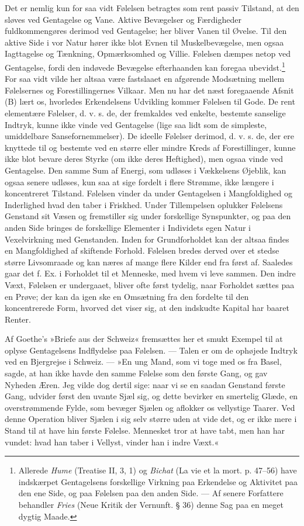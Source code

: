 \documentclass[12pt,a4paper,openany]{book}
\newcommand{\opage}[1]{\marginnote{\footnotesize\textit{[#1]}}}
\begin{document}
Det er nemlig kun for saa vidt Følelsen betragtes som rent passiv
Tilstand, at den sløves ved Gentagelse og Vane. Aktive Bevægelser og
Færdigheder fuldkommengøres derimod ved Gentagelse; her bliver Vanen til
Øvelse. Til den aktive Side i vor Natur hører ikke blot Evnen til
Muskelbevægelse, men ogsaa Iagttagelse og Tænkning, Opmærksomhed og
Villie. Følelsen dæmpes netop ved Gentagelse, fordi den indøvede
Bevægelse efterhaanden kan foregaa ubevidst.\footnote[1]{Allerede
\emph{Hume} (Treatise II, 3, 1) og \emph{Bichat} (La vie et la mort. p.
47--56) have indskærpet Gentagelsens forskellige Virkning paa Erkendelse
og Aktivitet paa den ene Side, og paa Følelsen paa den anden Side. ---
Af senere Forfattere behandler \emph{Fries} (Neue Kritik der Vernunft. §
36) denne Sag paa en meget dygtig Maade.} For saa vidt vilde her altsaa
være fastslaaet en afgørende Modsætning mellem Følelsernes og
Forestillingernes Vilkaar. Men nu har det næst foregaaende Afsnit (B)
lært os, hvorledes Erkendelsens Udvikling kommer Følelsen til Gode. De
rent elementære Følelser, d. v. s. de, der fremkaldes ved enkelte,
bestemte sanselige Indtryk, kunne ikke vinde ved Gentagelse (lige saa
lidt som de simpleste, umiddelbare Sansefornemmelser). De ideelle
Følelser derimod, d. v. s. de, der ere knyttede til og bestemte ved en
større eller mindre Kreds af Forestillinger, kunne ikke blot bevare
deres Styrke (om ikke deres Heftighed),
\opage{333}men ogsaa vinde ved Gentagelse. Den samme Sum af Energi, som
udløses i Vækkelsens Øjeblik, kan ogsaa senere udløses, kun saa at sige
fordelt i flere Strømme, ikke længere i koncentreret Tilstand. Følelsen
vinder da under Gentagelsen i Mangfoldighed og Inderlighed hvad den
taber i Friskhed. Under Tillempelsen oplukker Følelsens Genstand sit
Væsen og fremstiller sig under forskellige Synspunkter, og paa den anden
Side bringes de forskellige Elementer i Individets egen Natur i
Vexelvirkning med Genstanden. Inden for Grundforholdet kan der altsaa
findes en Mangfoldighed af skiftende Forhold. Følelsen bredes derved
over et stedse større Livsomraade og kan næres af mange flere Kilder end
fra først af. Saaledes gaar det f. Ex. i Forholdet til et Menneske, med
hvem vi leve sammen. Den indre Væxt, Følelsen er undergaaet, bliver ofte
først tydelig, naar Forholdet sættes paa en Prøve; der kan da igen ske
en Omsætning fra den fordelte til den koncentrerede Form, hvorved det
viser sig, at den indskudte Kapital har baaret Renter.

Af Goethe’s »Briefe aus der Schweiz« fremsættes her et smukt Exempel til
at oplyse Gentagelsens Indflydelse paa Følelsen. --- Talen er om de
ophøjede Indtryk ved en Bjergrejse i Schweiz. --- »En ung Mand, som vi
toge med os fra Basel, sagde, at han ikke havde den samme Følelse som
den første Gang, og gav Nyheden Æren. Jeg vilde dog dertil sige: naar vi
se en saadan Genstand første Gang, udvider først den uvante Sjæl sig, og
dette bevirker en smertelig Glæde, en overstrømmende Fylde, som bevæger
Sjælen og aflokker os vellystige Taarer. Ved denne Operation bliver
Sjælen i sig selv større uden at vide det, og er ikke mere i Stand til
at have hin første Følelse. Mennesket tror at have tabt, men han har
vundet: hvad han taber i Vellyst, vinder han i indre Væxt.«
\end{document}
